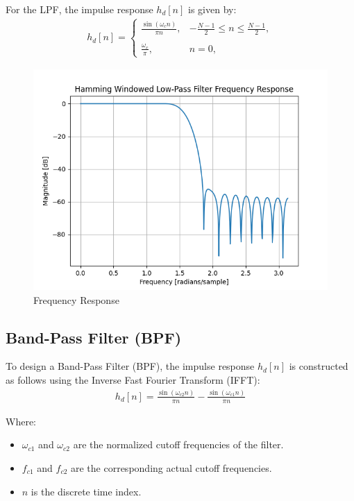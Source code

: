 \documentclass{article}
\begin{document}
For the LPF, the impulse response $ h_d[n]$ is given by:
\begin{align}
h_d[n] = \begin{cases}
    \frac{\sin(\omega_c n)}{\pi  n}, &  -\frac{N - 1}{2} \leq n \leq \frac{N - 1}{2}, \\
    \\
    \frac{\omega_c}{\pi}, &  n = 0,
\end{cases} \nonumber
\end{align}
\begin{figure}[ht]
  \centering
  \includegraphics[scale=0.8]{../figs/lpf.png}
  \caption{Frequency Response}
  \label{fig:lpf}
\end{figure}
\begin{center}
\end{center}
\subsection{Band-Pass Filter (BPF)}
To design a Band-Pass Filter (BPF), the impulse response \( h_d[n] \) is constructed as follows using the Inverse Fast Fourier Transform (IFFT):
\begin{align}
h_d[n] = \frac{{\sin(\omega_{c2} n)}}{\pi n} - \frac{{\sin(\omega_{c1} n)}}{\pi n}
\end{align}


Where:
\begin{itemize}
  \item \(\omega_{c1}\) and \(\omega_{c2}\) are the normalized cutoff frequencies of the filter.
  \item \(f_{c1}\) and \(f_{c2}\) are the corresponding actual cutoff frequencies.
  \item \(n\) is the discrete time index.
\end{itemize}
\end{document}
